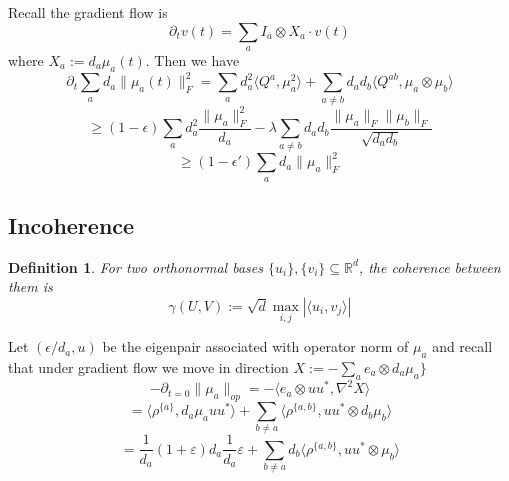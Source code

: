 \documentclass{article}
\newtheorem{definition}{Definition}
\newcommand{\R}{{\mathbb{R}}}
\newcommand\eps{\varepsilon}
\begin{document}
Recall the gradient flow is
\[ \partial_{t} v(t) = \sum_{a} I_{\overline{a}} \otimes X_{a} \cdot v(t)   \]
where $X_{a} := d_{a} \mu_{a}(t)$. Then we have
\[ \partial_{t} \sum_{a} d_{a} \|\mu_{a}(t)\|_{F}^{2} = \sum_{a} d_{a}^{2} \langle Q^{a}, \mu_{a}^{2} \rangle + \sum_{a \neq b} d_{a} d_{b} \langle Q^{ab}, \mu_{a} \otimes \mu_{b} \rangle  \]
\[ \geq (1-\epsilon) \sum_{a} d_{a}^{2} \frac{\|\mu_{a}\|_{F}^{2}}{d_{a}} - \lambda \sum_{a \neq b} d_{a} d_{b} \frac{\|\mu_{a}\|_{F} \|\mu_{b}\|_{F}}{\sqrt{d_{a} d_{b}}}   \]
\[ \geq (1-\epsilon') \sum_{a} d_{a} \|\mu_{a}\|_{F}^{2}   \]


\subsection{Incoherence}

\begin{definition}
For two orthonormal bases $\{u_{i}\},\{v_{i}\} \subseteq \R^{d}$, the coherence between them is
\[ \gamma(U,V) := \sqrt{d} \max_{i,j} |\langle u_{i}, v_{j} \rangle|  \]
\end{definition}

Let $(\epsilon/d_{a},u)$ be the eigenpair associated with operator norm of $\mu_{a}$ and recall that under gradient flow we move in direction $X := -\sum_{a} e_{a} \otimes d_{a} \mu_{a}\}$
\[ -\partial_{t=0} \|\mu_{a}\|_{op} = -\langle e_{a} \otimes uu^{*}, \nabla^{2} X \rangle     \]
\[ = \langle \rho^{\{a\}}, d_{a} \mu_{a} u u^{*} \rangle + \sum_{b \neq a} \langle \rho^{\{a,b\}}, u u^{*} \otimes d_{b} \mu_{b} \rangle    \]
\[ = \frac{1}{d_{a}} (1+\eps) d_{a} \frac{1}{d_{a}} \eps + \sum_{b \neq a} d_{b} \langle \rho^{\{a,b\}}, u u^{*} \otimes \mu_{b} \rangle   \]
\end{document}
